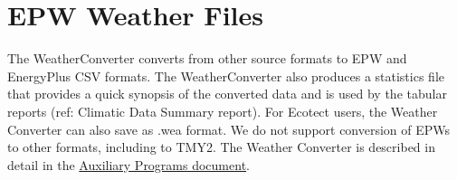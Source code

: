 \section{EPW Weather Files}\label{epw-weather-files}

The WeatherConverter converts from other source formats to EPW and EnergyPlus CSV formats. The WeatherConverter also produces a statistics file that provides a quick synopsis of the converted data and is used by the tabular reports (ref: Climatic Data Summary report). For Ecotect users, the Weather Converter can also save as .wea format. We do not support conversion of EPWs to other formats, including to TMY2. The Weather Converter is described in detail in the \href{file:///E:/Docs4PDFs/AuxiliaryPrograms.pdf}{Auxiliary Programs document}.
